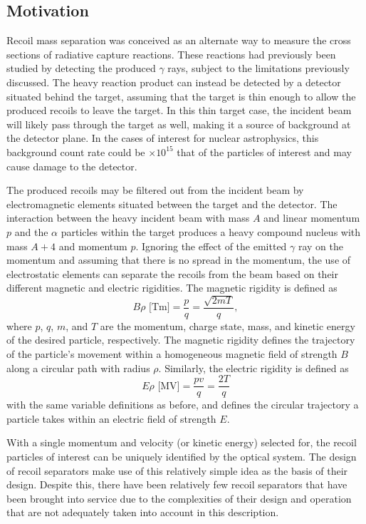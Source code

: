 \subsection{Motivation}
\label{ssec:recoil-separation-motivation}

Recoil mass separation was conceived as an alternate way to measure the cross
sections of radiative capture reactions. These reactions had previously been
studied by detecting the produced $\gamma$ rays, subject to the limitations
previously discussed. The heavy reaction product can instead be detected by a
detector situated behind the target, assuming that the target is thin enough to
allow the produced recoils to leave the target. In this thin target case, the
incident beam will likely pass through the target as well, making it a source
of background at the detector plane. In the cases of interest for nuclear
astrophysics, this background count rate could be $\times 10^{15}$ that of the
particles of interest and may cause damage to the detector.

The produced recoils may be filtered out from the incident beam by
electromagnetic elements situated between the target and the detector. The
interaction between the heavy incident beam with mass $A$ and linear momentum
$p$ and the $\alpha$ particles within
the target produces a heavy compound nucleus with mass $A + 4$ and momentum
$p$. Ignoring the effect of the emitted $\gamma$ ray on the momentum and
assuming that there is no spread in the momentum, the use of electrostatic
elements can separate the recoils from the beam based on their different
magnetic and electric rigidities. The magnetic rigidity is defined as
\begin{equation}
    \label{eq:brho}
    B\rho\textrm{ [Tm]} = \frac{p}{q} = \frac{\sqrt{2mT}}{q},
\end{equation}
where $p$, $q$, $m$, and $T$ are the momentum, charge state, mass, and kinetic
energy of the desired particle, respectively. The magnetic rigidity
defines the trajectory of the particle's movement within a homogeneous magnetic
field of strength $B$ along a circular path with radius $\rho$. Similarly, the
electric rigidity is defined as
\begin{equation}
    \label{eq:erho}
    E\rho\textrm{ [MV]} = \frac{pv}{q} = \frac{2T}{q}
\end{equation}
with the same variable definitions as before, and defines the circular
trajectory a particle takes within an electric field of strength $E$.

With a single momentum and
velocity (or kinetic energy) selected for, the recoil particles of interest can
be uniquely identified by the optical system. The design of recoil separators
make use of this relatively simple idea as the basis of their design. Despite
this, there have been relatively few recoil separators that have been brought
into service due to the complexities of their design and operation that are not
adequately taken into account in this description.

